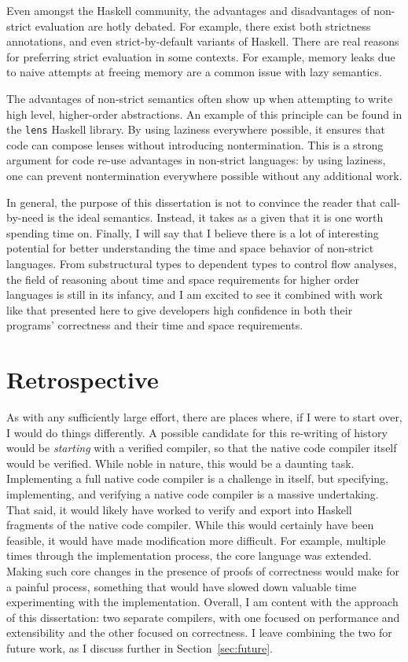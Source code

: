 Even amongst the Haskell community, the advantages and disadvantages of
non-strict evaluation are hotly debated. For example, there exist both
strictness annotations, and even strict-by-default variants of Haskell. There are
real reasons for preferring strict evaluation in some contexts. For example,
memory leaks due to naive attempts at freeing memory are a common issue with
lazy semantics. 

The advantages of non-strict semantics often show up when attempting to write
high level, higher-order abstractions. An example of this principle can be found
in the \texttt{lens} Haskell library. By using laziness everywhere possible, it
ensures that code can compose lenses without introducing nontermination. This is
a strong argument for code re-use advantages in non-strict languages: by using
laziness, one can prevent nontermination everywhere possible without any
additional work. 

In general, the purpose of this dissertation is not to convince the reader that
call-by-need is the ideal semantics. Instead, it takes as a given that it is one
worth spending time on. Finally, I will say that I believe there is a lot of
interesting potential for better understanding the time and space behavior of
non-strict languages. From substructural types to dependent types to control
flow analyses, the field of reasoning about time and space requirements for
higher order languages is still in its infancy, and I am excited to see it
combined with work like that presented here to give developers high confidence
in both their programs' correctness and their time and space requirements. 

\section{Retrospective}

As with any sufficiently large effort, there are places where, if I were to
start over, I would do things differently. A possible candidate for this
re-writing of history would be \emph{starting} with a verified compiler, so that
the native code compiler itself would be verified. While noble in nature, this
would be a daunting task. Implementing a full native code compiler is a
challenge in itself, but specifying, implementing, and verifying a native code
compiler is a massive undertaking. That said, it would likely have worked to
verify and export into Haskell fragments of the native code compiler. While this
would certainly have been feasible, it would have made modification more
difficult. For example, multiple times through the implementation process, the
core language was extended. Making such core changes in the presence of proofs
of correctness would make for a painful process, something that would have
slowed down valuable time experimenting with the implementation. Overall, I am
content with the approach of this dissertation: two separate compilers, with one
focused on performance and extensibility and the other focused on correctness. I
leave combining the two for future work, as I discuss further in
Section~\ref{sec:future}.

